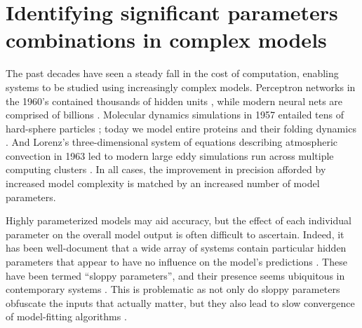 \chapter{Identifying significant parameters combinations in complex
  models \label{ch:params}}




The past decades have seen a steady fall in the cost of computation,
enabling systems to be studied using increasingly complex models.
Perceptron networks in the 1960's contained thousands of hidden units
\cite{nagy_neural_1991}, while modern neural nets are comprised of
billions \cite{hsu_biggest_2015}. Molecular dynamics simulations in
1957 entailed tens of hard-sphere particles \cite{alder_phase_1957};
today we model entire proteins and their folding dynamics
\cite{piana_atomic-level_2013}. And Lorenz's three-dimensional system
of equations describing atmospheric convection in 1963
\cite{lorenz_deterministic_1963} led to modern large eddy simulations
run across multiple computing clusters \cite{ghosal_dynamic_1995}. In
all cases, the improvement in precision afforded by increased model
complexity is matched by an increased number of model parameters.

Highly parameterized models may aid accuracy, but the effect of each
individual parameter on the overall model output is often difficult to
ascertain. Indeed, it has been well-document that a wide array of
systems contain particular hidden parameters that appear to have no
influence on the model's predictions
\cite{gutenkunst_extracting_2007}. These have been termed ``sloppy
parameters'', and their presence seems ubiquitous in contemporary
systems \cite{gutenkunst_universally_2007}. This is problematic as not
only do sloppy parameters obfuscate the inputs that actually
matter, but they also lead to slow convergence of model-fitting
algorithms \cite{transtrum_geometry_2011}.

